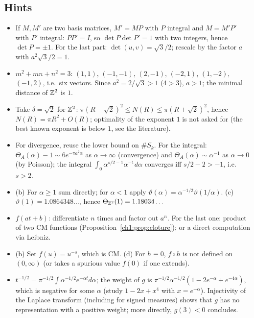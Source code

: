 \subsection*{Hints}

\begin{itemize}
\item[\ref{ch1:ex:covol}.] If $M,M'$ are two basis matrices, $M'=MP$ with $P$ integral and $M=M'P'$ with $P'$ integral: $PP'=I$, so $\det P\det P'=1$ with two
integers, hence $\det P=\pm1$. For the last part: $\det(u,v)=\sqrt3/2$; rescale by the factor $a$ with $a^2\sqrt3/2=1$.
\item[\ref{ch1:ex:voisins}.] $m^2+mn+n^2=3$: $(1,1)$, $(-1,-1)$, $(2,-1)$, $(-2,1)$, $(1,-2)$, $(-1,2)$, i.e.\ six vectors. Since $a^2=2/\sqrt3>1$ ($4>3$), $a>1$; the
minimal distance of $\mathbb{Z}^2$ is $1$.\item[\ref{ch1:ex:comptage}.] Take $\delta=\sqrt2$ for $\mathbb{Z}^2$: $\pi(R-\sqrt2)^2\le N(R)\le\pi(R+\sqrt2)^2$, hence $N(R)=\pi R^2+O(R)$; optimality of the exponent $1$ is not asked for (the best known exponent is below $1$, see the literature).
\item[\ref{ch1:ex:epstein}.] For divergence, reuse the lower bound on $\#S_k$. For the integral: $\Theta_A(\alpha)-1\sim6e^{-\pi a^2\alpha}$ as $\alpha\to\infty$ (convergence)
and $\Theta_A(\alpha)\sim\alpha^{-1}$ as $\alpha\to0$ (by Poisson); the integral $\int_0\alpha^{s/2-1}\alpha^{-1}d\alpha$ converges iff $s/2-2>-1$, i.e.\ $s>2$.
\item[\ref{ch1:ex:poisson}.] (b) For $\alpha\ge1$ sum directly; for $\alpha<1$ apply $\vartheta(\alpha)=\alpha^{-1/2}\vartheta(1/\alpha)$.
(c) $\vartheta(1)=1.0864348\ldots$, hence $\Theta_{\mathbb{Z}^2}(1)=1.18034\ldots$
\item[\ref{ch1:ex:clotures}.] $f(at+b)$: differentiate $n$ times and factor out $a^n$. For the last one: product of two CM functions (Proposition~\ref{ch1:prop:cloture}); or a direct computation via Leibniz.
\item[\ref{ch1:ex:comp}.] (b) Set $f(u)=u^{-s}$, which is CM. (d) For $h\equiv 0$, $f\circ h$ is not defined on $(0,\infty)$ (or takes a spurious value $f(0)$ if one extends).
\item[\ref{ch1:ex:melange}.] $t^{-1/2}=\pi^{-1/2}\int\alpha^{-1/2}e^{-\alpha t}d\alpha$; the weight of $g$ is $\pi^{-1/2}\alpha^{-1/2}(1-2e^{-\alpha}+e^{-4\alpha})$, which is negative for
some $\alpha$ (study $1-2x+x^4$ with $x=e^{-\alpha}$). Injectivity of the Laplace transform (including for signed measures) shows that $g$ has no representation with a positive weight; more directly, $g(3)<0$ concludes.

\end{itemize}
